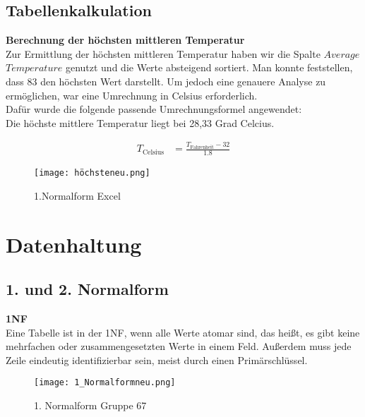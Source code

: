 \documentclass[a4paper,12pt]{article}
\begin{document}
\subsection{Tabellenkalkulation}
\textbf{Berechnung der höchsten mittleren Temperatur} 
\\Zur Ermittlung der höchsten mittleren Temperatur haben wir die Spalte $Average$ $Temperature$ genutzt und die Werte absteigend sortiert. Man konnte feststellen, dass 83 den höchsten Wert darstellt. Um jedoch eine genauere Analyse zu ermöglichen, war eine Umrechnung in Celsius erforderlich. \\Dafür wurde die folgende passende Umrechnungsformel angewendet:\\Die höchste mittlere Temperatur liegt bei 28,33 Grad Celcius.

    \begin{align*}
     T_{\text{Celsius}} &= \frac{T_{\text{Fahrenheit}} - 32}{1.8}
     \end{align*}

\begin{figure}[h]
        \centering
        \texttt{[image: höchsteneu.png]}
        \caption{1.Normalform Excel}
        \label{fig:enter-label}
    \end{figure}

\section{Datenhaltung}
\subsection{1. und 2. Normalform}



\textbf{1NF}\\Eine Tabelle ist in der 1NF, wenn alle Werte atomar sind, das heißt, es gibt keine mehrfachen oder zusammengesetzten Werte in einem Feld. Außerdem muss jede Zeile eindeutig identifizierbar sein, meist durch einen Primärschlüssel.\\ 

\begin{center}
\begin{figure}[h!]
    \centering
    \texttt{[image: 1\_Normalformneu.png]} 
    \caption{1. Normalform Gruppe 67 } 
    \label{fig:bildname} 
\end{figure}
\end{center}
\end{document}
